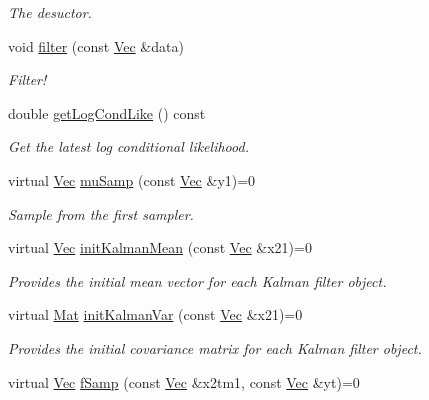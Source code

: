\begin{DoxyCompactItemize}
\begin{DoxyCompactList}\small\item\em The desuctor. \end{DoxyCompactList}\item 
void \hyperlink{classKalman__RBPF__BS_a195efd6d06215aa66defda0bb5a958e4}{filter} (const \hyperlink{apf__filter_8h_a4c7df05c6f5e8a0d15ae14bcdbc07152}{Vec} \&data)
\begin{DoxyCompactList}\small\item\em Filter! \end{DoxyCompactList}\item 
double \hyperlink{classKalman__RBPF__BS_a1c1e6a397dffee83dca8d98b4f174238}{get\+Log\+Cond\+Like} () const 
\begin{DoxyCompactList}\small\item\em Get the latest log conditional likelihood. \end{DoxyCompactList}\item 
virtual \hyperlink{apf__filter_8h_a4c7df05c6f5e8a0d15ae14bcdbc07152}{Vec} \hyperlink{classKalman__RBPF__BS_a7bee94069af44372af5f862219a9d9bd}{mu\+Samp} (const \hyperlink{apf__filter_8h_a4c7df05c6f5e8a0d15ae14bcdbc07152}{Vec} \&y1)=0
\begin{DoxyCompactList}\small\item\em Sample from the first sampler. \end{DoxyCompactList}\item 
virtual \hyperlink{apf__filter_8h_a4c7df05c6f5e8a0d15ae14bcdbc07152}{Vec} \hyperlink{classKalman__RBPF__BS_aad62ee3220c93d14fa6983013f0a1524}{init\+Kalman\+Mean} (const \hyperlink{apf__filter_8h_a4c7df05c6f5e8a0d15ae14bcdbc07152}{Vec} \&x21)=0
\begin{DoxyCompactList}\small\item\em Provides the initial mean vector for each Kalman filter object. \end{DoxyCompactList}\item 
virtual \hyperlink{apf__filter_8h_ae601f56a556993079f730483c574356f}{Mat} \hyperlink{classKalman__RBPF__BS_af7bde76f73af8af1b324d2da8fa7a652}{init\+Kalman\+Var} (const \hyperlink{apf__filter_8h_a4c7df05c6f5e8a0d15ae14bcdbc07152}{Vec} \&x21)=0
\begin{DoxyCompactList}\small\item\em Provides the initial covariance matrix for each Kalman filter object. \end{DoxyCompactList}\item 
virtual \hyperlink{apf__filter_8h_a4c7df05c6f5e8a0d15ae14bcdbc07152}{Vec} \hyperlink{classKalman__RBPF__BS_ae18fefa813cfcb43c3c7faae859fb9a9}{f\+Samp} (const \hyperlink{apf__filter_8h_a4c7df05c6f5e8a0d15ae14bcdbc07152}{Vec} \&x2tm1, const \hyperlink{apf__filter_8h_a4c7df05c6f5e8a0d15ae14bcdbc07152}{Vec} \&yt)=0

\end{DoxyCompactItemize}

